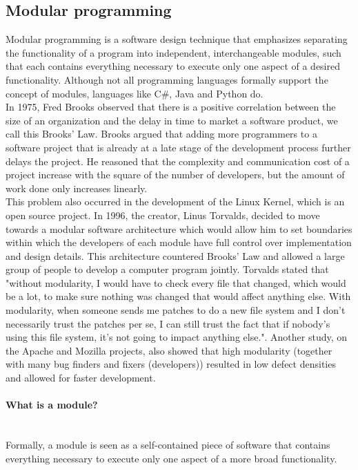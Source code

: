 \documentclass[twoside]{uva-inf-bachelor-thesis}
\newcommand{\myparagraph}[1]{\paragraph{#1}\mbox{}\\}
\begin{document}
\subsection{Modular programming}
Modular programming is a software design technique that emphasizes separating the functionality of a program into independent, interchangeable modules, such that each contains everything necessary to execute only one aspect of a desired functionality. Although not all programming languages formally support the concept of modules, languages like C\#\cite{csharpmodules}, Java\cite{javamodules} and Python\cite{pythonmodules} do.\\

In 1975, Fred Brooks observed that there is a positive correlation between the size of an organization and the delay in time to market a software product, we call this Brooks' Law\cite{brooks1975mythical}. Brooks argued that adding more programmers to a software project that is already at a late stage of the development process further delays the project. He reasoned that the complexity and communication cost of a project increase with the square of the number of developers, but the amount of work done only increases linearly\cite{lee2000linux}.\\

This problem also occurred in the development of the Linux Kernel, which is an open source project\cite{LinuxKernel}. In 1996, the creator, Linus Torvalds, decided to move towards a modular software architecture which would allow him to set boundaries within which the developers of each module have full control over implementation and design details. This architecture countered Brooks' Law and allowed a large group of people to develop a computer program jointly. Torvalds stated that "without modularity, I would have to check every file that changed, which would be a lot, to make sure nothing was changed that would affect anything else. With modularity, when someone sends me patches to do a new file system and I don't necessarily trust the patches per se, I can still trust the fact that if nobody's using this file system, it's not going to impact anything else."\cite{lee2000linux}. Another study, on the Apache and Mozilla projects, also showed that high modularity (together with many bug finders and fixers (developers)) resulted in low defect densities and allowed for faster development\cite{mockus2002two}.\\

\myparagraph{What is a module?}
\label{paragraph:module-definition}
Formally, a module is seen as a self-contained piece of software that contains everything necessary to execute only one aspect of a more broad functionality.\\
\end{document}

